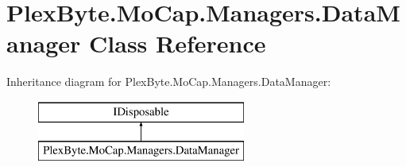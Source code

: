 \hypertarget{class_plex_byte_1_1_mo_cap_1_1_managers_1_1_data_manager}{}\section{Plex\+Byte.\+Mo\+Cap.\+Managers.\+Data\+Manager Class Reference}
\label{class_plex_byte_1_1_mo_cap_1_1_managers_1_1_data_manager}
Inheritance diagram for Plex\+Byte.\+Mo\+Cap.\+Managers.\+Data\+Manager\+:\begin{figure}[H]
\begin{center}
\leavevmode
\includegraphics[height=2.000000cm]{class_plex_byte_1_1_mo_cap_1_1_managers_1_1_data_manager}
\end{center}
\end{figure}
